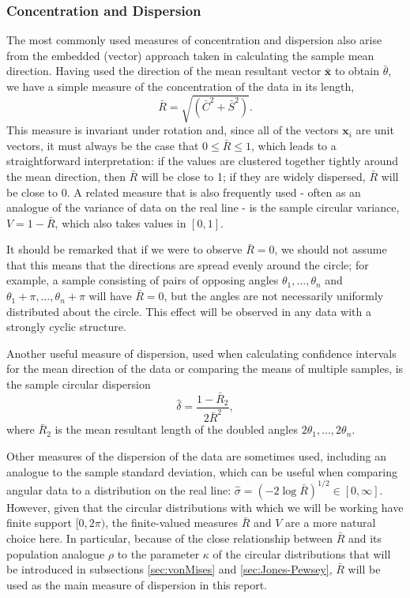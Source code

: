 \documentclass[../../ArchStats.tex]{subfiles}
\begin{document}
\subsubsection{Concentration and Dispersion}
\label{sec:params-R}
The most commonly used measures of concentration and dispersion also arise from the embedded (vector) approach taken in calculating the sample mean direction. Having used the direction of the mean resultant vector $\mathbf{\bar{x}}$ to obtain $\bar{\theta}$, we have a simple measure of the concentration of the data in its length, 
	\begin{equation}
	\label{eqn:R-bar}
	\bar{R} = \sqrt{(\bar{C}^2 + \bar{S}^2)}.
	\end{equation}
This measure is invariant under rotation and, since all of the vectors $\mathbf{x}_i$ are unit vectors, it must always be the case that $0 \leq \bar{R} \leq 1$, which leads to a straightforward interpretation: if the values are clustered together tightly around the mean direction, then $\bar{R}$ will be close to 1; if they are widely dispersed, $\bar{R}$ will be close to 0. A related measure that is also frequently used - often as an analogue of the variance of data on the real line - is the sample circular variance, $V = 1- \bar{R}$, which also takes values in $[0,1]$. 

It should be remarked that if we were to observe $\bar{R} = 0$, we should not assume that this means that the directions are spread evenly around the circle; for example, a sample consisting of pairs of opposing angles $\theta_1, \dots, \theta_n$ and $\theta_1+\pi, \dots, \theta_n+\pi$ will have $\bar{R} = 0$, but the angles are not necessarily uniformly distributed about the circle. This effect will be observed in any data with a strongly cyclic structure.

Another useful measure of dispersion, used when calculating confidence intervals for the mean direction of the data or comparing the means of multiple samples, is the sample circular dispersion
	\begin{equation}
	\label{eqn:delta-i}
	\hat{\delta} = \frac{1-\bar{R}_2}{2\bar{R}^2},
	\end{equation}
where $\bar{R}_2$ is the mean resultant length of the doubled angles $2\theta_1, \dots, 2\theta_n$. 

Other measures of the dispersion of the data are sometimes used, including an analogue to the  sample standard deviation, which can be useful when comparing angular data to a distribution on the real line: $\hat{\sigma} = (-2 \log \bar{R} ) ^{1/2} \in [0, \infty]$. However, given that the circular distributions with which we will be working have finite support $[0, 2\pi)$, the finite-valued measures $\bar{R}$ and $V$ are a more natural choice here. In particular, because of the close relationship between $\bar{R}$ and its population analogue $\rho$ to the parameter $\kappa$ of the circular distributions that will be introduced in subsections \ref{sec:vonMises} and \ref{sec:Jones-Pewsey}, $\bar{R}$ will be used as the main measure of dispersion in this report.
 
\end{document}
